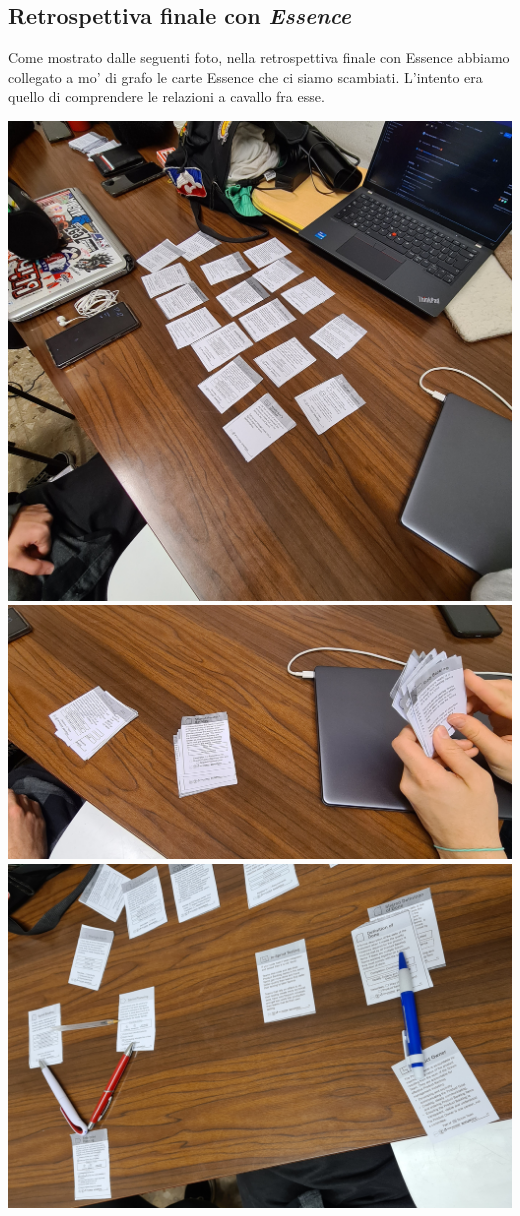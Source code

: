 \documentclass{article}
\begin{document}
\subsection{Retrospettiva finale con \emph{Essence}}

Come mostrato dalle seguenti foto, nella retrospettiva finale con Essence
abbiamo collegato a mo' di grafo le carte Essence che ci siamo scambiati.
L'intento era quello di comprendere le relazioni a cavallo fra esse.

\includegraphics[width=\textwidth]{essence-4-1.jpg}
\includegraphics[width=\textwidth]{essence-4-2.jpg}
\includegraphics[width=\textwidth]{essence-4-3.jpg}
\end{document}
